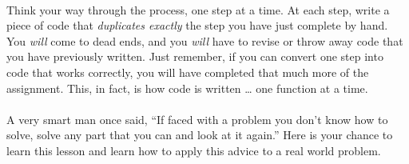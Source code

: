 \documentclass{article}
\begin{document}
\paragraph{}Think your way through the process, one step at a time. At each step, write a piece of code that \textit{duplicates exactly} the step you have just complete by hand. You \textit{will} come to dead ends, and you \textit{will} have to revise or throw away code that you have previously written. Just remember, if you can convert one step into code that works correctly, you will have completed that much more of the assignment. This, in fact, is how code is written \ldots{} one function at a time.

\paragraph{}A very smart man once said, ``If faced with a problem you don't know how to solve, solve any part that you can and look at it again.'' Here is your chance to learn this lesson and learn how to apply this advice to a real world problem.
\end{document}
